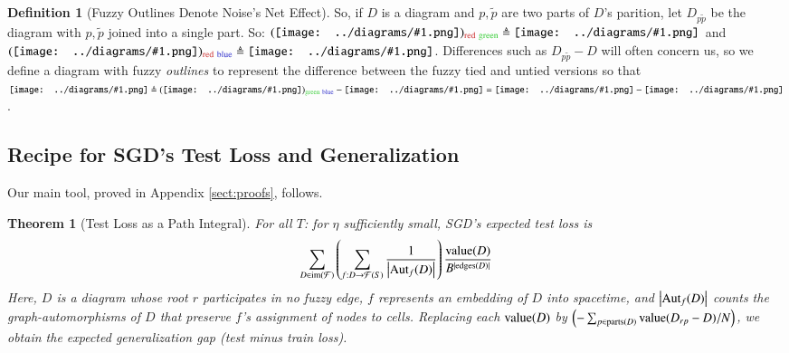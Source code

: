 \documentclass{article}
\theoremstyle{plain}
\newtheorem{thm}{Theorem}
\theoremstyle{definition}
\newtheorem{defn}{Definition}
\newcommand{\Free}{\mathcal{F}}
\newcommand{\Aut}{\text{\textnormal{Aut}}}
\newcommand{\image}{\text{\textnormal{im}}}
\newcommand{\dvalue}{\text{\textnormal{value}}}
\newcommand{\edges}{\text{\textnormal{edges}}}
\newcommand{\parts}{\text{\textnormal{parts}}}
\newcommand{\wrap}[1]{\left(#1\right)}
\newcommand{\wabs}[1]{\left|#1\right|}
\newcommand{\sdia}[1]{\begin{gathered}\texttt{[image: ../diagrams/\#1.png]}\end{gathered}}
\begin{document}
        \begin{defn}[Fuzzy Outlines Denote Noise's Net Effect]
            So, if $D$ is a diagram and $p, \tilde p$ are two parts of $D$'s
            parition, let $D_{p\tilde p}$ be the diagram with $p, \tilde p$
            joined into a single part.  So:
            $
                (\sdia{(0-1)(01)})_{\text{\color{moor}red}~\text{\color{moog}green}}
                \triangleq
                \sdia{(01)(01)}
            $
            and
            $
                (\sdia{(01-2-3)(02-12-23)})_{\text{\color{moor}red}~\text{\color{moob}blue}}
                \triangleq
                \sdia{(013-2)(02-12-23)}
            $.
            Differences such as $D_{p\tilde p}-D$ will often concern us, so we
            define a diagram with fuzzy \emph{outlines} to represent the
            difference between the fuzzy tied and untied versions so that
            $
                \sdia{c(0-12)(01-12)}
                \triangleq
                (\sdia{(0-1-2)(01-12)})_{\text{\color{moog}green}~\text{\color{moob}blue}}
                -
                \sdia{(0-1-2)(01-12)}
                =
                \sdia{(0-12)(01-12)}
                -
                \sdia{(0-1-2)(01-12)}
            $.
        \end{defn}
            

    \subsection{Recipe for SGD's Test Loss and Generalization}
        Our main tool, proved in Appendix \ref{sect:proofs}, follows.
        
        \begin{thm}[Test Loss as a Path Integral] \label{thm:sgdcoef}
            For all $T$: for $\eta$ sufficiently small, SGD's expected test
            loss is
            \begin{equation*}\label{eq:sgdcoef}
                \sum_{D \in \image(\Free)} \wrap{
                    \sum_{f: D\to\Free(S)}
                    \frac{1}{\wabs{\Aut_f(D)}}
                }
                \frac{\dvalue(D)}{B^{|\edges(D)|}}
            \end{equation*}
            Here, $D$ is a diagram whose root $r$ participates in no fuzzy
            edge,    $f$ represents an embedding of $D$ into spacetime, and
            $\wabs{\Aut_f(D)}$ counts the graph-automorphisms of $D$ that
            preserve $f$'s assignment of nodes to cells.
            Replacing each $\dvalue(D)$ by
            $
                \wrap{-\sum_{p \in \parts(D)} \dvalue(D_{rp} - D)/N}
            $,
            we obtain the expected generalization gap (test minus train
            loss).
        \end{thm}
    
\end{document}
